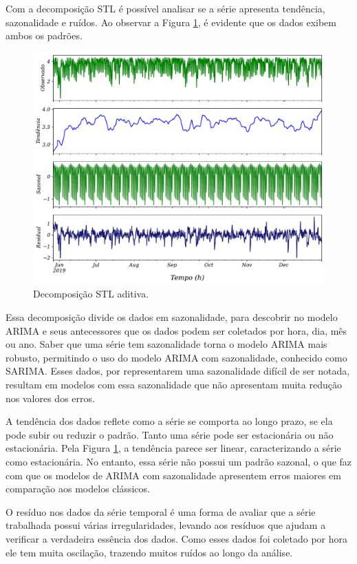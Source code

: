 Com a decomposição STL é possível analisar se a série apresenta tendência, sazonalidade e ruídos. Ao observar a Figura \ref{fig:stl}, é evidente que os dados exibem ambos os padrões. 

\begin{figure}[!htb]
	\centering
	\caption{Decomposição STL aditiva.}
	\label{fig:stl}
	\includegraphics[width=\linewidth]{Resultados/Figuras/STL}	
\end{figure}


Essa decomposição divide os dados em sazonalidade, para descobrir no modelo ARIMA e seus antecessores que os dados podem ser coletados por hora, dia, mês ou ano. Saber que uma série tem sazonalidade torna o modelo ARIMA mais robusto, permitindo o uso do modelo ARIMA com sazonalidade, conhecido como SARIMA. Esses dados, por representarem uma sazonalidade difícil de ser notada, resultam em modelos com essa sazonalidade que não apresentam muita redução nos valores dos erros.

A tendência dos dados reflete como a série se comporta ao longo prazo, se ela pode subir ou reduzir o padrão. Tanto uma série pode ser estacionária ou não estacionária. Pela Figura \ref{fig:stl}, a tendência parece ser linear, caracterizando a série como estacionária. No entanto, essa série não possui um padrão sazonal, o que faz com que os modelos de ARIMA com sazonalidade apresentem erros maiores em comparação aos modelos clássicos.

O resíduo nos dados da série temporal é uma forma de avaliar que a série trabalhada possui várias irregularidades, levando aos resíduos que ajudam a verificar a verdadeira essência dos dados. Como esses dados foi coletado por hora ele tem muita oscilação, trazendo muitos ruídos ao longo da análise.

